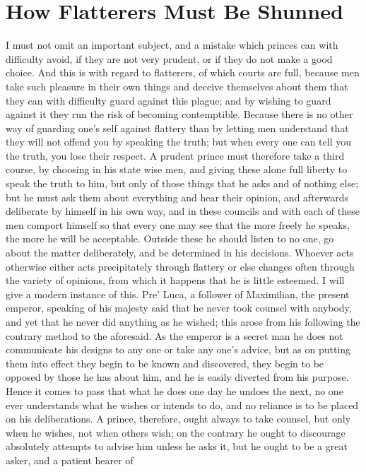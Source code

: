 \documentclass[12pt,letterpaper]{memoir}
\begin{document}
\chapter{How Flatterers Must Be Shunned}

I must not omit an important subject, and a mistake which princes
can with difficulty avoid, if they are not very prudent, or if they
do not make a good choice. And this is with regard to flatterers, of
which courts are full, because men take such pleasure in their own
things and deceive themselves about them that they can with difficulty
guard against this plague; and by wishing to guard against it they run
the risk of becoming contemptible. Because there is no other way of
guarding one's self against flattery than by letting men understand
that they will not offend you by speaking the truth; but when every one
can tell you the truth, you lose their respect. A prudent prince must
therefore take a third course, by choosing in his state wise men, and
giving these alone full liberty to speak the truth to him, but only of
those things that he asks and of nothing else; but he must ask them
about everything and hear their opinion, and afterwards deliberate by
himself in his own way, and in these councils and with each of these
men comport himself so that every one may see that the more freely he
speaks, the more he will be acceptable. Outside these he should listen
to no one, go about the matter deliberately, and be determined in his
decisions. Whoever acts otherwise either acts precipitately through
flattery or else changes often through the variety of opinions, from
which it happens that he is little esteemed. I will give a modern
instance of this. Pre' Luca, a follower of Maximilian, the present
emperor, speaking of his majesty said that he never took counsel with
anybody, and yet that he never did anything as he wished; this arose
from his following the contrary method to the aforesaid. As the emperor
is a secret man he does not communicate his designs to any one or
take any one's advice, but as on putting them into effect they begin
to be known and discovered, they begin to be opposed by those he has
about him, and he is easily diverted from his purpose. Hence it comes
to pass that what he does one day he undoes the next, no one ever
understands what he wishes or intends to do, and no reliance is to be
placed on his deliberations. A prince, therefore, ought always to take
counsel, but only when he wishes, not when others wish; on the contrary
he ought to discourage absolutely attempts to advise him unless he
asks it, but he ought to be a great asker, and a patient hearer of
\end{document}
